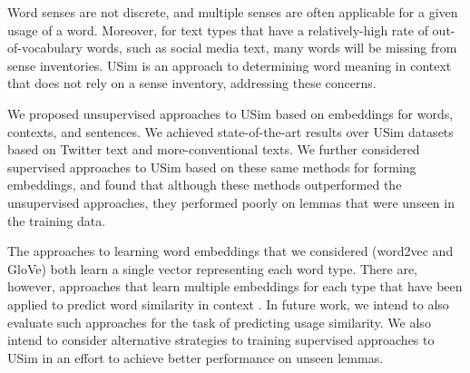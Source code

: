 \documentclass[11pt]{article}
\newcommand\glove{GloVe\xspace}
\begin{document}
Word senses are not discrete, and multiple senses are often applicable
for a given usage of a word. Moreover, for text types that have a
relatively-high rate of out-of-vocabulary words, such as social media
text, many words will be missing from sense inventories. USim is an
approach to determining word meaning in context that does not rely on
a sense inventory, addressing these concerns.




We proposed unsupervised approaches to USim based on embeddings for
words, contexts, and sentences. We achieved state-of-the-art results
over USim datasets based on Twitter text and more-conventional
texts. We further considered supervised approaches to USim based on
these same methods for forming embeddings, and found that although
these methods outperformed the unsupervised approaches, they performed
poorly on lemmas that were unseen in the training data. 

The approaches to learning word embeddings that we considered
(word2vec and \glove) both learn a single vector representing each
word type. There are, however, approaches that learn multiple
embeddings for each type that have been applied to predict word
similarity in context \cite[for
  example]{Huang+:2012,Neelakantan+:2014}. In future work, we intend
to also evaluate such approaches for the task of predicting usage
similarity. We also intend to consider alternative strategies to
training supervised approaches to USim in an effort to achieve better
performance on unseen lemmas.


\end{document}
